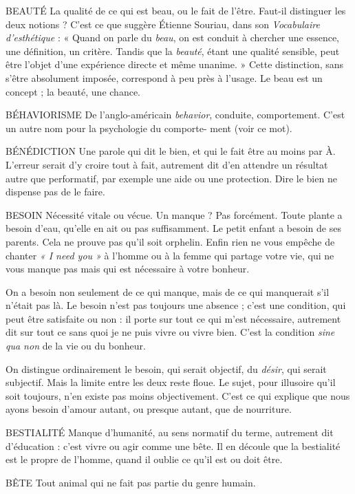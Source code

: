 BEAUTÉ La qualité de ce qui est beau, ou le fait de l’être. Faut-il distinguer
les deux notions ? C’est ce que suggère Étienne Souriau, dans son
{\it Vocabulaire d'esthétique} : « Quand on parle du {\it beau}, on est conduit à chercher
une essence, une définition, un critère. Tandis que la {\it beauté}, étant une qualité
sensible, peut être l’objet d’une expérience directe et même unanime. » Cette
distinction, sans s’être absolument imposée, correspond à peu près à l'usage. Le
beau est un concept ; la beauté, une chance.

BÉHAVIORISME De l’anglo-américain {\it behavior}, conduite, comportement.
C’est un autre nom pour la psychologie du comporte-
ment (voir ce mot).

BÉNÉDICTION Une parole qui dit le bien, et qui le fait être au moins par
À. L'erreur serait d’y croire tout à fait, autrement dit d’en
attendre un résultat autre que performatif, par exemple une aide ou une protection.
Dire le bien ne dispense pas de le faire.

BESOIN Nécessité vitale ou vécue. Un manque ? Pas forcément. Toute plante
a besoin d’eau, qu’elle en ait ou pas suffisamment. Le petit enfant a
besoin de ses parents. Cela ne prouve pas qu’il soit orphelin. Enfin rien ne vous
empêche de chanter {\it « I need you »} à l'homme ou à la femme qui partage votre
vie, qui ne vous manque pas mais qui est nécessaire à votre bonheur.

On a besoin non seulement de ce qui manque, mais de ce qui manquerait
s’il n’était pas là. Le besoin n’est pas toujours une absence ; c’est une condition,
qui peut être satisfaite ou non : il porte sur tout ce qui m'est nécessaire, autrement
dit sur tout ce sans quoi je ne puis vivre ou vivre bien. C’est la condition
{\it sine qua non} de la vie ou du bonheur.

On distingue ordinairement le besoin, qui serait objectif, du {\it désir}, qui serait
subjectif. Mais la limite entre les deux reste floue. Le sujet, pour illusoire qu’il
soit toujours, n’en existe pas moins objectivement. C’est ce qui explique que
nous ayons besoin d’amour autant, ou presque autant, que de nourriture.

BESTIALITÉ Manque d'humanité, au sens normatif du terme, autrement
dit d'éducation : c’est vivre ou agir comme une bête. Il en
découle que la bestialité est le propre de l’homme, quand il oublie ce qu’il est
ou doit être.

BÊTE Tout animal qui ne fait pas partie du genre humain.

